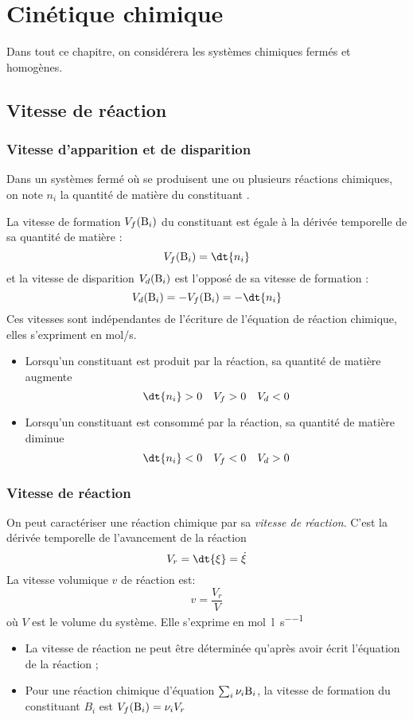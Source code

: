 \documentclass{cours}
\begin{document}
\setcounter{chapter}{5}
\shorthandoff{:!}
\chapter{Cinétique chimique}%
Dans tout ce chapitre, on considérera les systèmes chimiques fermés et homogènes.

\section{Vitesse de réaction}%
\label{sec:vitesse_de_reaction}

\subsection{Vitesse d'apparition et de disparition}%
\label{sub:vitesse_d_apparition_et_de_disparition}
Dans un systèmes fermé où se produisent une ou plusieurs réactions chimiques, on note $n_i$ la quantité de matière du constituant .

La vitesse de formation $V_f(\ce{B_i})$ du constituant  est égale à la dérivée temporelle de sa quantité de matière : 
%
\[ V_f(\ce{B_i}) = \dt{n_i} \]
%
et la vitesse de disparition $V_d(\ce{B_i})$ est l'opposé de sa vitesse de formation :
%
\[  V_d(\ce{B_i}) = -V_f(\ce{B_i}) = -\dt{n_i} \]
%
Ces vitesses sont indépendantes de l'écriture de l'équation de réaction chimique, elles s'expriment en \si{mol/s}.

\begin{itemize}
  \item Lorsqu'un constituant est produit par la réaction, sa quantité de matière augmente 
  \[ \dt{n_i} > 0 \quad V_f>0 \quad V_d<0\]
  \item Lorsqu'un constituant est consommé  par la réaction, sa quantité de matière diminue
  \[ \dt{n_i} < 0 \quad V_f<0 \quad V_d>0\]
\end{itemize}

\subsection{Vitesse de réaction}%
\label{sub:vitesse_de_reaction}
On peut caractériser une réaction chimique par sa \emph{vitesse de réaction}. C'est la dérivée temporelle de l'avancement de la réaction
%
\[V_r = \dt{\xi} = \dot{\xi}\]
%
La vitesse volumique $v$ de réaction est:
%
\[v=\frac{V_r}{V}\]
%
où $V$ est le volume du système. Elle s'exprime en \si{\mol\per\litre\per\second}
\begin{itemize}
  \item La vitesse de réaction ne peut être déterminée qu'après avoir écrit l'équation de la réaction ;
  \item Pour une réaction chimique d'équation $\sum_i \nu_i \ce{B_i}$, la vitesse de formation du constituant $B_i$  est $V_f(\ce{B_i}) = \nu_i V_r$ 
\end{itemize}
\end{document}
